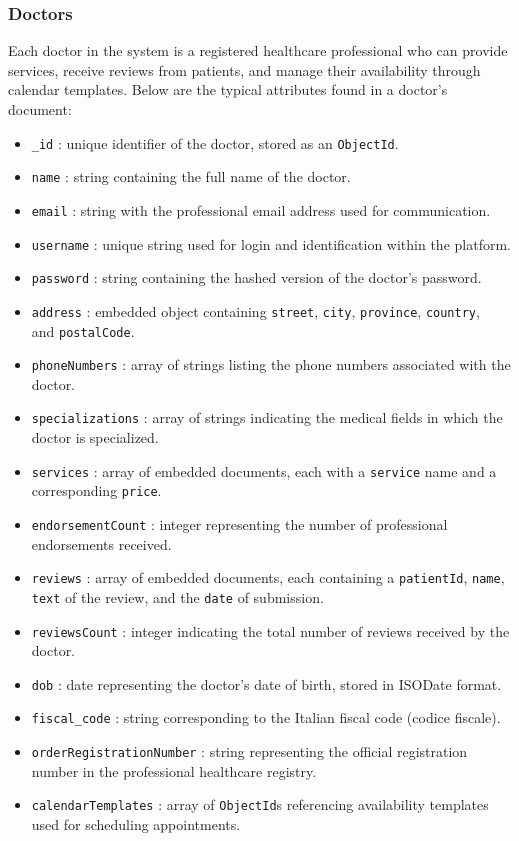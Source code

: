 \subsubsection{Doctors}
Each doctor in the system is a registered healthcare professional who can provide services, receive reviews from patients, and manage their availability through calendar templates. Below are the typical attributes found in a doctor's document:

\begin{itemize}
  \item \texttt{\_id} : unique identifier of the doctor, stored as an \texttt{ObjectId}.
  \item \texttt{name} : string containing the full name of the doctor.
  \item \texttt{email} : string with the professional email address used for communication.
  \item \texttt{username} : unique string used for login and identification within the platform.
  \item \texttt{password} : string containing the hashed version of the doctor's password.
  \item \texttt{address} : embedded object containing \texttt{street}, \texttt{city}, \texttt{province}, \texttt{country},\\ and \texttt{postalCode}.
  \item \texttt{phoneNumbers} : array of strings listing the phone numbers associated with the doctor.
  \item \texttt{specializations} : array of strings indicating the medical fields in which the doctor is specialized.
  \item \texttt{services} : array of embedded documents, each with a \texttt{service} name and a corresponding \texttt{price}.
  \item \texttt{endorsementCount} : integer representing the number of professional endorsements received.
  \item \texttt{reviews} : array of embedded documents, each containing a \texttt{patientId}, \texttt{name}, \texttt{text} of the review, and the \texttt{date} of submission.
  \item \texttt{reviewsCount} : integer indicating the total number of reviews received by the doctor.
  \item \texttt{dob} : date representing the doctor's date of birth, stored in ISODate format.
  \item \texttt{fiscal\_code} : string corresponding to the Italian fiscal code (codice fiscale).
  \item \texttt{orderRegistrationNumber} : string representing the official registration number in the professional healthcare registry.
  \item \texttt{calendarTemplates} : array of \texttt{ObjectId}s referencing availability templates used for scheduling appointments.
\end{itemize}

